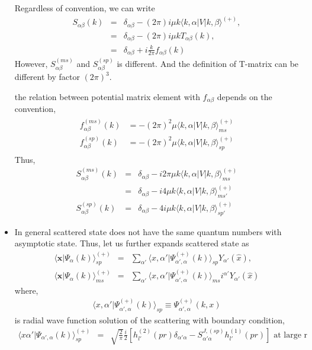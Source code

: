 \documentclass[10pt]{book}
\def\bm{\boldsymbol}
\newcommand{\bea}{\begin{eqnarray}}
\newcommand{\eea}{\end{eqnarray}}
\newcommand{\no}{\nonumber \\}
\def\vx{{\bm x}}
\def\la{\langle}
\def\ra{\rangle}
\begin{document}
\begin{itemize}
Regardless of convention,  we can write 
\begin{equation}
\boxed{
\begin{array}{ccl}
S_{\alpha\beta}(k)
&=&\delta_{\alpha\beta}-(2\pi)i \mu k 
        \la k,\alpha| V| k,\beta\ra^{(+)},\\
&=&\delta_{\alpha\beta} -(2\pi)i \mu k T_{\alpha\beta}(k),\\
&=&\delta_{\alpha\beta}+ i\frac{k}{2\pi} f_{\alpha\beta}(k)
\end{array}
}
\end{equation}
However, $S_{\alpha\beta}^{(ms)}$
and $S_{\alpha\beta}^{(sp)}$ is different.
And the definition of T-matrix can be different by factor $(2\pi)^3$.

the relation between potential matrix
element with $f_{\alpha\beta}$ depends on the convention,
\bea
\boxed{
\begin{array}{cl}
f_{\alpha\beta}^{(ms)}(k)
&=-(2\pi)^2\mu \la k,\alpha|V|k,\beta\ra^{(+)}_{ms} \\
f_{\alpha\beta}^{(sp)}(k)
&=-(2\pi)^2\mu \la k,\alpha|V|k,\beta\ra^{(+)}_{sp}
\end{array}
}
\eea
Thus,
\bea
S_{\alpha\beta}^{(ms)}(k)
&=&\delta_{\alpha\beta}
  -i2\pi \mu k \la k,\alpha|V|k,\beta\ra^{(+)}_{ms}\no
&=&\delta_{\alpha\beta}
  -i4 \mu k \la k,\alpha|V|k,\beta\ra^{(+)}_{ms'}\no
S_{\alpha\beta}^{(sp)}(k)&=&\delta_{\alpha\beta}
  -4 i \mu k \la k,\alpha|V|k,\beta\ra^{(+)}_{sp'} 
\eea



\item In general scattered state does not have the same
quantum numbers with asymptotic state.
Thus, let us further expands scattered state as
\bea
\la \vx |\Psi_\alpha(k)\ra^{(+)}_{sp}
&=&\sum_{\alpha'} 
\la x,\alpha'|\Psi^{(+)}_{\alpha',\alpha}(k)\ra_{sp}
Y_{\alpha'}(\hat{x}),\no
\la \vx |\Psi_\alpha(k)\ra^{(+)}_{ms}
&=&\sum_{\alpha'} 
\la x,\alpha'|\Psi^{(+)}_{\alpha',\alpha}(k)\ra_{ms}
i^{\alpha'}Y_{\alpha'}(\hat{x})
\eea
where,
\bea
\la x,\alpha'|\Psi^{(+)}_{\alpha',\alpha}(k)\ra_{sp}
\equiv \Psi^{(+)}_{\alpha',\alpha}(k,x)
\eea
is radial wave function solution 
of the scattering with 
boundary condition,
\bea
\la x \alpha'|\Psi_{\alpha',\alpha}(k)\ra^{(+)}_{sp}
&=&\sqrt{\frac{2}{\pi}}\frac{i}{2}
                  [h^{(2)}_{l'}(pr)\delta_{\alpha'\alpha}
                      -S^{J,(sp)}_{\alpha'\alpha} 
                      h^{(1)}_{l'}(pr)] 
                      \mbox{ at large r}
\eea


\end{itemize}
\end{document}
